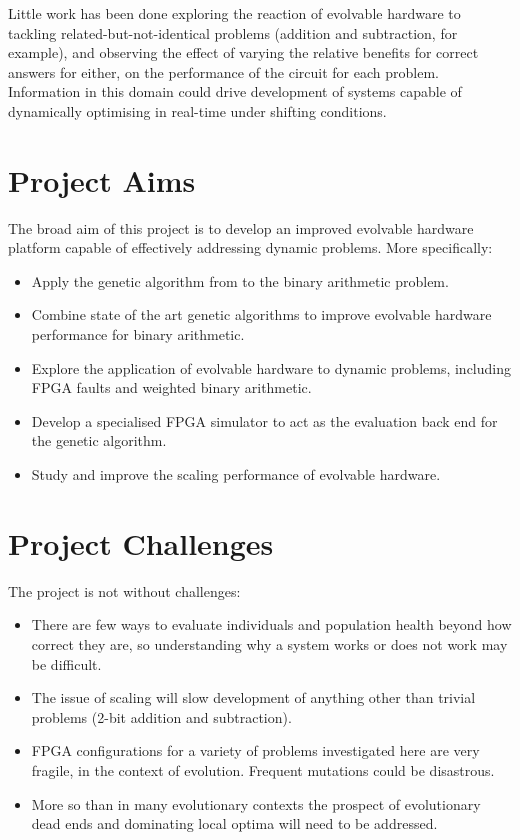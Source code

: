Little work has been done exploring the reaction of evolvable hardware to tackling
related-but-not-identical problems (addition and subtraction, for example), and observing
the effect of varying
the relative benefits for correct answers for either, on the performance of the circuit for each problem.
Information in this domain could
drive development of systems capable of dynamically optimising in real-time
under shifting conditions.

\section{Project Aims}

The broad aim of this project is to develop an improved evolvable hardware
platform capable of effectively addressing dynamic problems. More specifically:
\begin{itemize}
	\item Apply the genetic algorithm from \cite{10.1007/3-540-63173-9_61} to
		the binary arithmetic problem.
	\item Combine state of the art genetic algorithms to improve
		evolvable hardware performance for binary arithmetic.
	\item Explore the application of evolvable hardware to dynamic
		problems, including FPGA faults and weighted binary arithmetic.
	\item Develop a specialised FPGA simulator to act as the evaluation
		back end for the genetic algorithm.
	\item Study and improve the scaling performance of evolvable hardware.
\end{itemize}

\section{Project Challenges}
The project is not without challenges:
\begin{itemize}
	\item There are few ways to evaluate individuals and population health beyond how
		correct they are, so understanding why a system works or does not work may
		be difficult.
	\item The issue of scaling will slow development of anything other than
		trivial problems (2-bit addition and subtraction).
	\item FPGA configurations for a variety of problems investigated here are very fragile, in the
		context of evolution. Frequent mutations could be disastrous.
	\item More so than in many evolutionary contexts the prospect of evolutionary dead ends
		and dominating local optima will need to be addressed.
\end{itemize}
